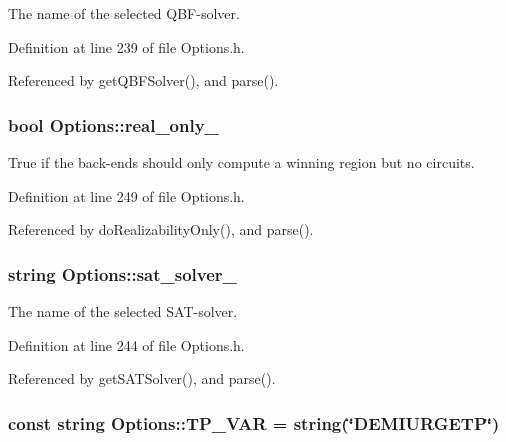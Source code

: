 The name of the selected Q\-B\-F-\/solver. 



Definition at line 239 of file Options.\-h.



Referenced by get\-Q\-B\-F\-Solver(), and parse().

\hypertarget{classOptions_a2e3668079f6c62e087edd486d19bf84a}{
\subsubsection[{real\-\_\-only\-\_\-}]{\setlength{\rightskip}{0pt plus 5cm}bool Options\-::real\-\_\-only\-\_\-\hspace{0.3cm}{\ttfamily [protected]}}}\label{classOptions_a2e3668079f6c62e087edd486d19bf84a}


True if the back-\/ends should only compute a winning region but no circuits. 



Definition at line 249 of file Options.\-h.



Referenced by do\-Realizability\-Only(), and parse().

\hypertarget{classOptions_af68f26928f23fda3bdc75c4b43ae17bc}{
\subsubsection[{sat\-\_\-solver\-\_\-}]{\setlength{\rightskip}{0pt plus 5cm}string Options\-::sat\-\_\-solver\-\_\-\hspace{0.3cm}{\ttfamily [protected]}}}\label{classOptions_af68f26928f23fda3bdc75c4b43ae17bc}


The name of the selected S\-A\-T-\/solver. 



Definition at line 244 of file Options.\-h.



Referenced by get\-S\-A\-T\-Solver(), and parse().

\hypertarget{classOptions_ad3285bfd4c5984cd79988ddce49ee507}{
\subsubsection[{T\-P\-\_\-\-V\-A\-R}]{\setlength{\rightskip}{0pt plus 5cm}const string Options\-::\-T\-P\-\_\-\-V\-A\-R = string(\char`\"{}D\-E\-M\-I\-U\-R\-G\-E\-T\-P\char`\"{})\hspace{0.3cm}{\ttfamily [static]}}}\label{classOptions_ad3285bfd4c5984cd79988ddce49ee507}



